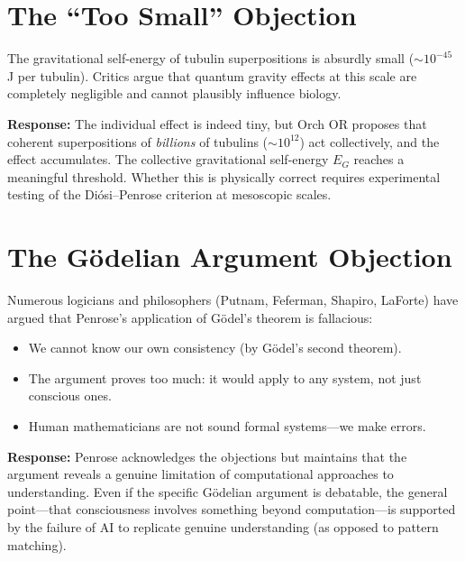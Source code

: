 \documentclass[11pt,a4paper]{report}
\begin{document}
\section{The ``Too Small'' Objection}

\begin{objbox}
The gravitational self-energy of tubulin superpositions is absurdly small ($\sim 10^{-45}$ J per tubulin). Critics argue that quantum gravity effects at this scale are completely negligible and cannot plausibly influence biology.
\end{objbox}

\textbf{Response:} The individual effect is indeed tiny, but Orch OR proposes that coherent superpositions of \emph{billions} of tubulins ($\sim 10^{12}$) act collectively, and the effect accumulates. The collective gravitational self-energy $E_G$ reaches a meaningful threshold. Whether this is physically correct requires experimental testing of the Di\'osi--Penrose criterion at mesoscopic scales.

\section{The G\"odelian Argument Objection}

\begin{objbox}
Numerous logicians and philosophers (Putnam, Feferman, Shapiro, LaForte) have argued that Penrose's application of G\"odel's theorem is fallacious:
\begin{itemize}[leftmargin=1.5em]
  \item We cannot know our own consistency (by G\"odel's second theorem).
  \item The argument proves too much: it would apply to any system, not just conscious ones.
  \item Human mathematicians are not sound formal systems---we make errors.
\end{itemize}
\end{objbox}

\textbf{Response:} Penrose acknowledges the objections but maintains that the argument reveals a genuine limitation of computational approaches to understanding. Even if the specific G\"odelian argument is debatable, the general point---that consciousness involves something beyond computation---is supported by the failure of AI to replicate genuine understanding (as opposed to pattern matching).
\end{document}
